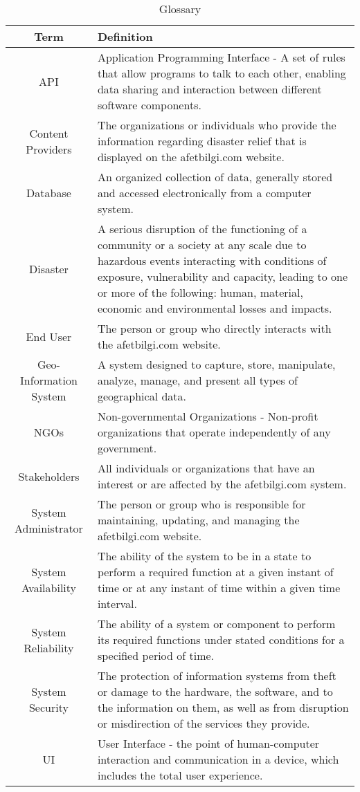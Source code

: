 \documentclass[12pt, letterpaper]{article}
\begin{document}
\begin{table}[H]
    \centering
    \begin{tabular}{|c|p{11cm}|}
        \hline
        \textbf{Term} & \textbf{Definition} \\
        \hline
        API & Application Programming Interface - A set of rules that allow programs to talk to each other, enabling data sharing and interaction between different software components. \\
        \hline
        Content Providers & The organizations or individuals who provide the information regarding disaster relief that is displayed on the afetbilgi.com website. \\
        \hline
        Database & An organized collection of data, generally stored and accessed electronically from a computer system.\\
        \hline
        Disaster & A serious disruption of the functioning of a community or a society at any scale due to hazardous events interacting with conditions of exposure, vulnerability and capacity, leading to one or more of the following: human, material, economic and environmental losses and impacts. \\
        \hline
        End User & The person or group who directly interacts with the afetbilgi.com website. \\
        \hline
        Geo-Information System & A system designed to capture, store, manipulate, analyze, manage, and present all types of geographical data.\\
        \hline
        NGOs & Non-governmental Organizations - Non-profit organizations that operate independently of any government. \\
        \hline
        Stakeholders & All individuals or organizations that have an interest or are affected by the afetbilgi.com system. \\
        \hline
        System Administrator & The person or group who is responsible for maintaining, updating, and managing the afetbilgi.com website. \\
        \hline
        System Availability & The ability of the system to be in a state to perform a required function at a given instant of time or at any instant of time within a given time interval.\\
        \hline
        System Reliability & The ability of a system or component to perform its required functions under stated conditions for a specified period of time.\\
        \hline
        System Security & The protection of information systems from theft or damage to the hardware, the software, and to the information on them, as well as from disruption or misdirection of the services they provide.\\
        \hline
        UI & User Interface - the point of human-computer interaction and communication in a device, which includes the total user experience.\\
        \hline
    \end{tabular}
    \caption{Glossary}
    \label{Glossary}
\end{table}
\end{document}
